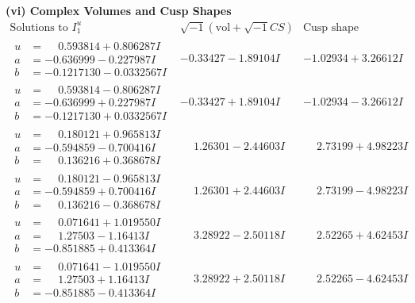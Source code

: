 \documentclass[1p]{elsarticle_modified}
\theoremstyle{definition}
\newcommand{\I}{\sqrt{-1}}
\begin{document}
\newpage\flushleft \textbf{(vi) Complex Volumes and Cusp Shapes}
$$\begin{array}{c|c|c}  
\text{Solutions to }I^u_{1}& \I (\text{vol} + \sqrt{-1}CS) & \text{Cusp shape}\\
 \hline 
\begin{aligned}
u &= \phantom{-}0.593814 + 0.806287 I \\
a &= -0.636999 - 0.227987 I \\
b &= -0.1217130 - 0.0332567 I\end{aligned}
 & -0.33427 - 1.89104 I & -1.02934 + 3.26612 I \\ \hline\begin{aligned}
u &= \phantom{-}0.593814 - 0.806287 I \\
a &= -0.636999 + 0.227987 I \\
b &= -0.1217130 + 0.0332567 I\end{aligned}
 & -0.33427 + 1.89104 I & -1.02934 - 3.26612 I \\ \hline\begin{aligned}
u &= \phantom{-}0.180121 + 0.965813 I \\
a &= -0.594859 - 0.700416 I \\
b &= \phantom{-}0.136216 + 0.368678 I\end{aligned}
 & \phantom{-}1.26301 - 2.44603 I & \phantom{-}2.73199 + 4.98223 I \\ \hline\begin{aligned}
u &= \phantom{-}0.180121 - 0.965813 I \\
a &= -0.594859 + 0.700416 I \\
b &= \phantom{-}0.136216 - 0.368678 I\end{aligned}
 & \phantom{-}1.26301 + 2.44603 I & \phantom{-}2.73199 - 4.98223 I \\ \hline\begin{aligned}
u &= \phantom{-}0.071641 + 1.019550 I \\
a &= \phantom{-}1.27503 - 1.16413 I \\
b &= -0.851885 + 0.413364 I\end{aligned}
 & \phantom{-}3.28922 - 2.50118 I & \phantom{-}2.52265 + 4.62453 I \\ \hline\begin{aligned}
u &= \phantom{-}0.071641 - 1.019550 I \\
a &= \phantom{-}1.27503 + 1.16413 I \\
b &= -0.851885 - 0.413364 I\end{aligned}
 & \phantom{-}3.28922 + 2.50118 I & \phantom{-}2.52265 - 4.62453 I \\ \hline\begin{aligned}

\end{aligned}
\end{array}$$
\end{document}
